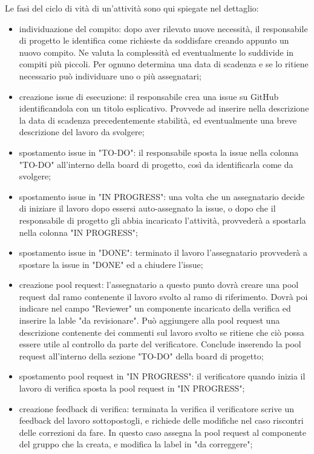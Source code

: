 Le fasi del ciclo di vità di un'attività sono qui spiegate nel dettaglio:
\begin{itemize}
    \item individuazione del compito: dopo aver rilevato nuove necessità, il responsabile di progetto le identifica come richieste da soddisfare creando appunto un nuovo compito. Ne valuta la complessità ed eventualmente lo suddivide in compiti più piccoli. Per ognuno determina una data di scadenza e se lo ritiene necessario può individuare uno o più assegnatari;
    \item creazione issue di esecuzione: il responsabile crea una issue su GitHub identificandola con un titolo esplicativo. Provvede ad inserire nella descrizione la data di scadenza precedentemente stabilità, ed eventualmente una breve descrizione del lavoro da svolgere;
    \item spostamento issue in "TO-DO": il responsabile sposta la issue nella colonna "TO-DO" all'interno della board di progetto, così da identificarla come da svolgere;
    \item spostamento issue in "IN PROGRESS": una volta che un assegnatario decide di iniziare il lavoro dopo essersi auto-assegnato la issue, o dopo che il responsabile di progetto gli abbia incaricato l'attività, provvederà a spostarla nella colonna "IN PROGRESS"; 
    \item spostamento issue in "DONE": terminato il lavoro l'assegnatario provvederà a spostare la issue in "DONE" ed a chiudere l'issue;
    \item creazione pool request: l'assegnatario a questo punto dovrà creare una pool request dal ramo contenente il lavoro svolto al ramo di riferimento. Dovrà poi indicare nel campo "Reviewer" un componente incaricato della verifica ed inserire la lable "da revisionare". Può aggiungere alla pool request una descrizione contenente dei commenti sul lavoro svolto se ritiene che ciò possa essere utile al controllo da parte del verificatore. Conclude inserendo la pool request all'interno della sezione "TO-DO" della board di progetto;
    \item spostamento pool request in "IN PROGRESS": il verificatore quando inizia il lavoro di verifica sposta la pool request in "IN PROGRESS";
    \item creazione feedback di verifica: terminata la verifica il verificatore scrive un feedback del lavoro sottopostogli, e richiede delle modifiche nel caso riscontri delle correzioni da fare. In questo caso assegna la pool request al componente del gruppo che la creata, e modifica la label in "da correggere";

\end{itemize}
